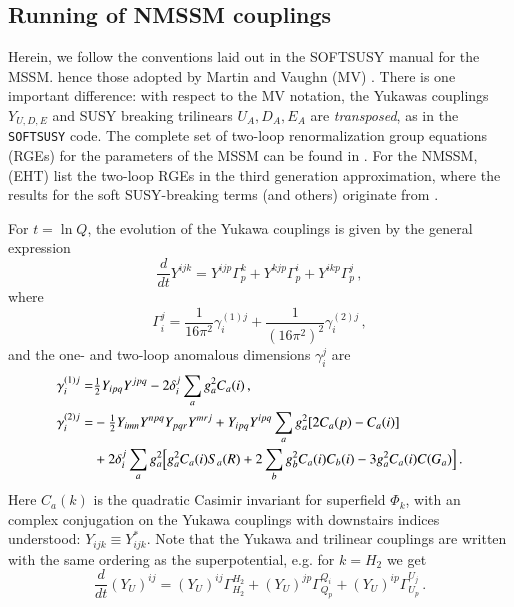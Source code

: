 \documentclass[final,3p,times,pdflatex]{elsarticle}
\newcommand{\dt}{\frac{d}{dt}}
\begin{document}
\subsection{Running of NMSSM couplings~\label{running}}
Herein, we follow the conventions laid out in the SOFTSUSY manual for the MSSM.  hence those adopted by Martin and Vaughn (MV) \cite{MV94}.  There is one important difference: with respect to the MV notation, the Yukawas couplings $Y_{U,D,E}$ and SUSY breaking trilinears $U_A,D_A,E_A$ are {\it transposed}, as in the {\tt SOFTSUSY} code. The complete set of two-loop renormalization group equations (RGEs) for the parameters of the MSSM can be found in \cite{MV94,Yam94}.  For the NMSSM, \cite{Ellwanger:2009dp} (EHT) list the two-loop RGEs in the third generation approximation, where the results for the soft SUSY-breaking terms (and others) originate from \cite{Ell08}.

For $t = \ln Q$, the evolution of the Yukawa couplings is given by the general expression
%
\begin{equation}
\dt Y^{ijk} = Y^{ijp}\Gamma_p^k + Y^{kjp}\Gamma_p^i + Y^{ikp}\Gamma_p^j\,,
\end{equation}
%
where 
%
\begin{equation}
\Gamma_i^j = \frac{1}{16\pi^2}\gamma_i^{(1)j} 
+ \frac{1}{(16\pi^2)^2}\gamma_{i}^{(2)j}\,,
\end{equation}
%
and the one- and two-loop anomalous dimensions $\gamma_i^j$ are
%
\begin{align}
\gamma_i^{(1)j} =& \tfrac{1}{2}Y_{ipq}Y^{jpq} - 2\delta_i^j \sum_a g_a^2C_a(i)\,, \\
%
\gamma_i^{(2)j} =& -\tfrac{1}{2}Y_{imn}Y^{npq}Y_{pqr}Y^{mrj} 
+ Y_{ipq}Y^{ipq} \sum_a g_a^2[2C_a(p) - C_a(i)] \notag \\
%
&+ 2\delta_i^j \sum_a g_a^2 
\Big[g_a^2C_a(i)S_a(R) +2\sum_b g_b^2C_a(i)C_b(i) - 3g_a^2C_a(i)C(G_a)\Big]\,.
\end{align}
%
Here $C_a(k)$ is the quadratic Casimir invariant for superfield $\Phi_k$, with 
an complex conjugation on the Yukawa couplings with downstairs indices 
understood: $Y_{ijk} \equiv Y_{ijk}^*$.  Note that the Yukawa and trilinear 
couplings are written with the same ordering as the superpotential, e.g. for 
$k = H_2$ we get
%
\begin{equation}
\dt (Y_U)^{ij} = (Y_U)^{ij}\Gamma^{H_2}_{H_2} + (Y_U)^{jp}\Gamma_{Q_p}^{Q_i} + (Y_U)^{ip}\Gamma_{U_p}^{U_j}\,.
\end{equation}
\end{document}

